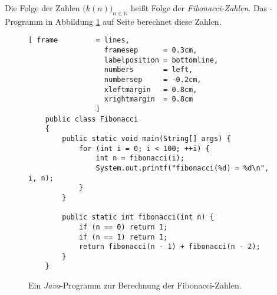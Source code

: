 Die Folge der Zahlen $\bigl(k(n)\bigr)_{n\in\mathbb{N}}$ hei{\ss}t Folge der \emph{Fibonacci-Zahlen}.  Das \Java-Programm in Abbildung
\ref{fig:fibonacci} auf Seite \pageref{fig:fibonacci} berechnet diese Zahlen.

\begin{figure}[!h]
  \centering
\begin{Verbatim}[ frame         = lines, 
                  framesep      = 0.3cm, 
                  labelposition = bottomline,
                  numbers       = left,
                  numbersep     = -0.2cm,
                  xleftmargin   = 0.8cm,
                  xrightmargin  = 0.8cm
                ]
    public class Fibonacci 
    {
        public static void main(String[] args) {
            for (int i = 0; i < 100; ++i) {
                int n = fibonacci(i);
                System.out.printf("fibonacci(%d) = %d\n", i, n);
            }
        }
        
        public static int fibonacci(int n) {
            if (n == 0) return 1;
            if (n == 1) return 1;
            return fibonacci(n - 1) + fibonacci(n - 2);
        }
    }
\end{Verbatim}
\vspace*{-0.3cm}
  \caption{Ein \textsl{Java}-Programm zur Berechnung der Fibonacci-Zahlen.}
  \label{fig:fibonacci}
\end{figure} 

